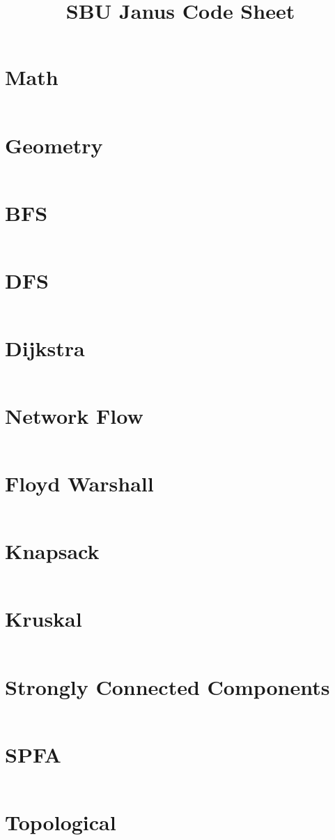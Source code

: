 \documentclass{article}
\begin{document}
\title{SBU Janus Code Sheet}
\date{}
\maketitle
\tableofcontents
\newpage
\section{Math}
\inputminted{python}{../acm_math.py}
\newpage
\section{Geometry}
\inputminted{python}{../geometry.py}
\newpage
\section{BFS}
\inputminted{python}{../bfs.py}
\newpage
\section{DFS}
\inputminted{python}{../dfs.py}
\newpage
\section{Dijkstra}
\inputminted{python}{../dijkstra.py}
\newpage
\section{Network Flow}
\inputminted{python}{../flow.py}
\newpage
\section{Floyd Warshall}
\inputminted{python}{../floyd.py}
\newpage
\section{Knapsack}
\inputminted{python}{../knapsack.py}
\newpage
\section{Kruskal}
\inputminted{python}{../kruskal.py}
\newpage
\section{Strongly Connected Components}
\inputminted{python}{../scc.py}
\newpage
\section{SPFA}
\inputminted{python}{../spfa.py}
\newpage
\section{Topological}
\inputminted{python}{../topological.py}
\end{document}
